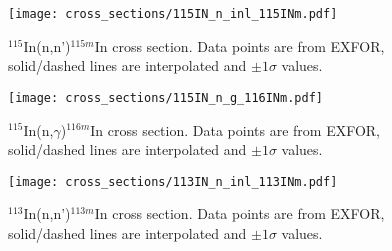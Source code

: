 \begin{figure}[htb]
\texttt{[image: cross\_sections/115IN\_n\_inl\_115INm.pdf]}
\caption{$^{115}$In(n,n')$^{115m}$In cross section.  Data points are from EXFOR, solid/dashed lines are interpolated and $\pm 1\sigma$ values.}
\label{fig:115IN_n_inl_115INm}
\end{figure}

\begin{figure}[htb]
\texttt{[image: cross\_sections/115IN\_n\_g\_116INm.pdf]}
\caption{$^{115}$In(n,$\gamma$)$^{116m}$In cross section.  Data points are from EXFOR, solid/dashed lines are interpolated and $\pm 1\sigma$ values.}
\label{fig:115IN_n_g_116INm}
\end{figure}

\begin{figure}[htb]
\texttt{[image: cross\_sections/113IN\_n\_inl\_113INm.pdf]}
\caption{$^{113}$In(n,n')$^{113m}$In cross section.  Data points are from EXFOR, solid/dashed lines are interpolated and $\pm 1\sigma$ values.}
\label{fig:113IN_n_inl_113INm}
\end{figure}

